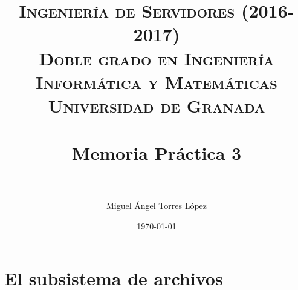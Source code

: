 
\usepackage{listings}



\title{	
\normalfont \normalsize 
\textsc{\textbf{Ingeniería de Servidores (2016-2017)} \\ Doble grado en Ingeniería Informática y Matemáticas \\ Universidad de Granada} \\ [25pt] %
\horrule{2pt} \\[0.4cm] %
\huge Memoria Práctica 3 \\ %
\horrule{2pt} \\[0.5cm] %
}

\author{Miguel Ángel Torres López} %

\date{\normalsize\today} %




\maketitle %

\newpage %

\tableofcontents %

\newpage

\listoffigures

\listoftables

\newpage


\section{El subsistema de archivos}

